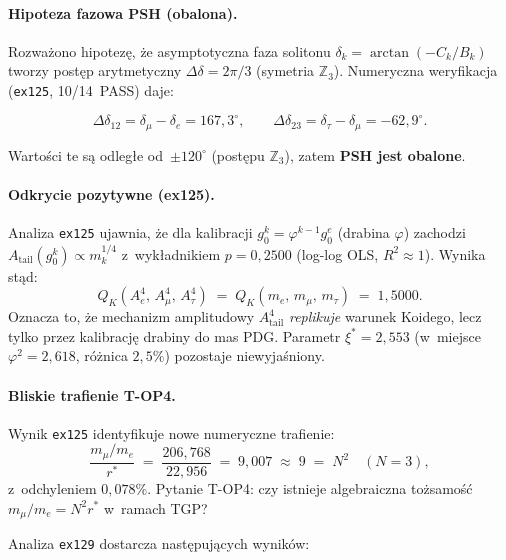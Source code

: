\paragraph{Hipoteza fazowa PSH (obalona).}
Rozwa\.zono hipotez\k{e}, \.ze asymptotyczna faza solitonu
$\delta_k = \arctan(-C_k/B_k)$ tworzy post\k{e}p
arytmetyczny $\Delta\delta = 2\pi/3$ (symetria $\mathbb{Z}_3$).
Numeryczna weryfikacja (\texttt{ex125}, 10/14~PASS) daje:

\begin{equation}
  \Delta\delta_{12} = \delta_\mu - \delta_e = 167{,}3^\circ,
  \qquad
  \Delta\delta_{23} = \delta_\tau - \delta_\mu = -62{,}9^\circ.
\end{equation}

Warto\'sci te s\k{a} odleg\l{}e od~$\pm 120^\circ$ (post\k{e}pu
$\mathbb{Z}_3$), zatem \textbf{PSH jest obalone}.

\paragraph{Odkrycie pozytywne (ex125).}
Analiza \texttt{ex125} ujawnia, \.ze dla kalibracji
$g_0^k = \varphi^{k-1} g_0^e$ (drabina $\varphi$) zachodzi
$A_{\mathrm{tail}}(g_0^k) \propto m_k^{1/4}$ z~wyk\l{}adnikiem
$p = 0{,}2500$ (log-log OLS, $R^2 \approx 1$).  Wynika st\k{a}d:
\begin{equation}
  Q_K(A_e^4,\, A_\mu^4,\, A_\tau^4)
  \;=\; Q_K(m_e,\, m_\mu,\, m_\tau)
  \;=\; 1{,}5000.
\end{equation}
Oznacza to, \.ze mechanizm amplitudowy $A_{\mathrm{tail}}^4$
\emph{replikuje} warunek Koidego, lecz tylko przez kalibracj\k{e}
drabiny do mas PDG.  Parametr $\xi^*=2{,}553$ (w~miejsce
$\varphi^2=2{,}618$, ró\.znica $2{,}5\%$) pozostaje niewyja\'sniony.

\paragraph{Bliskie trafienie T-OP4.}
Wynik \texttt{ex125} identyfikuje nowe numeryczne trafienie:
\begin{equation}\label{eq:T2-TOP4}
  \frac{m_\mu/m_e}{r^*}
  \;=\; \frac{206{,}768}{22{,}956}
  \;=\; 9{,}007
  \;\approx\; 9 \;=\; N^2 \quad (N=3),
\end{equation}
z~odchyleniem $0{,}078\%$.  Pytanie T-OP4: czy istnieje
algebraiczna to\.zsamo\'s\'c $m_\mu/m_e = N^2 r^*$ w~ramach TGP?

Analiza \texttt{ex129} dostarcza nast\k{e}puj\k{a}cych wynik\'ow:

